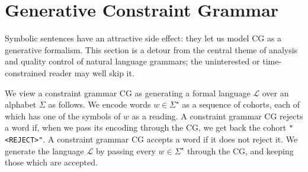 \def\t#1{\texttt{#1}}
\def\h#1{{\tt \color{gray} #1}}
\def\swf{\h{"<s>"}}
\def\maxAmb#1{$\langle \Sigma \rangle_#1$}
\def\maxAmbFSA#1{$\langle \Sigma,S \rangle_#1$}
\def\maxAmbCFG#1{$\langle \Sigma,\Sigma^{\prime} \rangle_#1$}
\def\exampleWord{{present}}


\section{Generative Constraint Grammar}
\label{sec:expressivity}

Symbolic sentences have an attractive side effect: they let us model
CG as a generative formalism. This section is a detour from the
central theme of analysis and quality control of natural language
grammars; the uninterested or time-constrained reader may well skip it.

We view a constraint grammar CG as generating a formal language $\mathcal{L}$
over an alphabet $\Sigma$ as follows.
We encode words $w \in \Sigma^\star$ as a sequence of cohorts, each of which has
one of the symbols of $w$ as a reading.
A constraint grammar CG rejects a word if, when we pass its encoding through the
CG, we get back the cohort \t{"<REJECT>"}. A constraint grammar CG accepts a word
if it does not reject it.
We generate the language $\mathcal{L}$ by passing every $w \in \Sigma^\star$
through the CG, and keeping those which are accepted.

